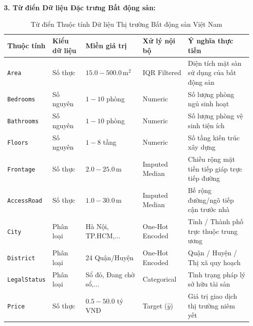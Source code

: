 \documentclass[12pt,a4paper]{report}
\begin{document}
\textbf{3. Từ điển Dữ liệu Đặc trưng Bất động sản:}
\begin{table}[H]
\centering
\small
\begin{tabularx}{\textwidth}{llllX}
\toprule
\textbf{Thuộc tính} & \textbf{Kiểu dữ liệu} & \textbf{Miền giá trị} & \textbf{Xử lý nội bộ} & \textbf{Ý nghĩa thực tiễn} \\
\midrule
\texttt{Area} & Số thực & $15.0 - 500.0\,\text{m}^2$ & IQR Filtered & Diện tích mặt sàn sử dụng của bất động sản \\
\texttt{Bedrooms} & Số nguyên & $1 - 10$ phòng & Numeric & Số lượng phòng ngủ sinh hoạt \\
\texttt{Bathrooms} & Số nguyên & $1 - 10$ phòng & Numeric & Số lượng phòng vệ sinh tiện ích \\
\texttt{Floors} & Số nguyên & $1 - 8$ tầng & Numeric & Số tầng kiến trúc xây dựng \\
\texttt{Frontage} & Số thực & $2.0 - 25.0\,\text{m}$ & Imputed Median & Chiều rộng mặt tiền tiếp giáp trực tiếp đường \\
\texttt{AccessRoad} & Số thực & $1.0 - 30.0\,\text{m}$ & Imputed Median & Bề rộng đường/ngõ tiếp cận trước nhà \\
\texttt{City} & Phân loại & Hà Nội, TP.HCM,... & One-Hot Encoded & Tỉnh / Thành phố trực thuộc trung ương \\
\texttt{District} & Phân loại & 24 Quận/Huyện & One-Hot Encoded & Quận / Huyện / Thị xã quy hoạch \\
\texttt{LegalStatus} & Phân loại & Sổ đỏ, Đang chờ sổ,... & Categorical & Tình trạng pháp lý sở hữu tài sản \\
\midrule
\texttt{Price} & Số thực & $0.5 - 50.0$ tỷ VNĐ & Target ($\hat{y}$) & Giá trị giao dịch thị trường niêm yết \\
\bottomrule
\end{tabularx}
\caption{Từ điển Thuộc tính Dữ liệu Thị trường Bất động sản Việt Nam}
\label{tab:realestate_features}
\end{table}
\end{document}
